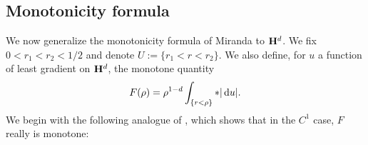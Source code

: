 
\subsection{Monotonicity formula}
We now generalize the monotonicity formula of Miranda \cite[Teorema 3.3]{Miranda66} to $\mathbf H^d$.
We fix $0 < r_1 < r_2 < 1/2$ and denote $U := \{r_1 < r < r_2\}$.
We also define, for $u$ a function of least gradient on $\mathbf H^d$, the monotone quantity 
\begin{equation}\label{monotone quantity}
    F(\rho) = \rho^{1 - d} \int_{\{r < \rho\}} *|\mathop{}\!\mathrm{d} u|.
\end{equation}
We begin with the following analogue of \cite[pg68]{Giusti77}, which shows that in the $C^1$ case, $F$ really is monotone:

